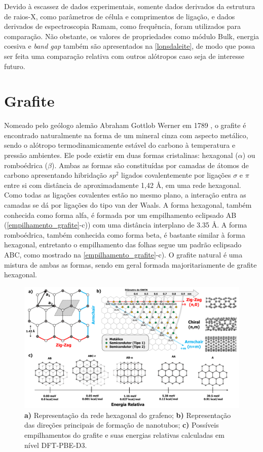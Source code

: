  		Devido à escassez de dados experimentais, somente dados derivados da estrutura de raios-X, como parâmetros de célula e comprimentos de ligação, e dados derivados de espectroscopia Ramam, como frequência, foram utilizados para comparação. Não obstante, os valores de propriedades como módulo Bulk, energia coesiva e \textit{band gap} também são apresentados na \autoref{lonsdaleite}, de modo que possa ser feita uma comparação relativa com outros alótropos caso seja de interesse futuro.
 		
 	
	\section{Grafite}

		Nomeado pelo geólogo alemão Abraham Gottlob Werner em 1789 \cite{frohs2000carbon}, o grafite é encontrado naturalmente na forma de um mineral cinza com aspecto metálico, sendo o alótropo termodinamicamente estável do carbono à temperatura e pressão ambientes. Ele pode existir em duas formas cristalinas: hexagonal ($\alpha$) ou romboédrica ($\beta$). Ambas as formas são constituídas por camadas de átomos de carbono apresentando hibridação $sp^2$ ligados covalentemente por ligações $\sigma$ e $\pi$ entre si com distância de aproximadamente 1,42 \AA{}, em uma rede hexagonal. Como todas as ligações covalentes estão no mesmo plano, a interação entra as camadas se dá por ligações do tipo van der Waals. A forma hexagonal, também conhecida como forma alfa, é formada por um empilhamento eclipsado AB (\autoref{empilhamento_grafite}-c)) com uma distância interplano de 3.35 \AA{}. A forma romboédrica, também conhecida como forma beta, é bastante similar à forma hexagonal, entretanto o empilhamento das folhas segue um padrão eclipsado ABC, como mostrado na \autoref{empilhamento_grafite}-c). O grafite natural é uma mistura de ambas as formas, sendo em geral formada majoritariamente de grafite hexagonal.\cite{burchell1999carbon}	
		
		\begin{figure}[!h]
			\centering
			\includegraphics[width=1\linewidth]{capitulos/fig/results0/empilhamento_grafite}
			\caption{\textbf{a)} Representação da rede hexagonal do grafeno; \textbf{b)} Representação das direções principais de formação de nanotubos; \textbf{c)} Possíveis empilhamentos do grafite e suas energias relativas calculadas em nível DFT-PBE-D3.}
			\label{empilhamento_grafite}
		\end{figure}
	
